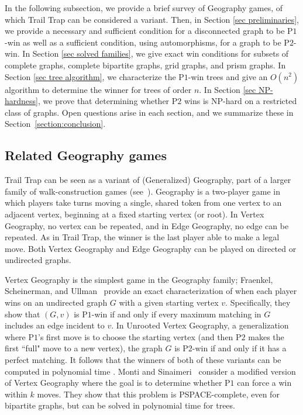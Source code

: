\documentclass{article}
\theoremstyle{plain}
\theoremstyle{definition}
\def\pone{{\rm{P}\ensuremath{1}}}
\def\ptwo{{\rm{P}\ensuremath{2}}}
\def\poneposs{{\rm{P}\ensuremath{1}'s}}
\begin{document}
In the following subsection, we provide a brief survey of Geography games, of which {\sc Trail Trap} can be considered a variant. Then, in Section \ref{sec preliminaries}, we provide a necessary and sufficient condition for a disconnected graph to be \pone{}-win as well as a sufficient condition, using automorphisms, for a graph to be \ptwo{}-win.
In Section \ref{sec solved families}, we give exact win conditions for subsets of complete graphs, complete bipartite graphs, grid graphs, and prism graphs. In Section \ref{sec tree algorithm}, we characterize the \pone{}-win trees and give an $O(n^2)$ algorithm to determine the winner for trees of order $n$. In Section \ref{sec NP-hardness}, we prove that determining whether \ptwo{} wins is NP-hard  on a restricted class of graphs. Open questions arise in each section, and we summarize these in Section~\ref{section:conclusion}.

\subsection{Related Geography games}\label{sub:related games}

{\sc Trail Trap} can be seen as a variant of (Generalized) Geography, part of a larger family of walk-construction games (see~\cite{bodlaender1993complexity}). Geography is a two-player game in which players take turns moving a single, shared token from one vertex to an adjacent vertex, beginning at a fixed starting vertex (or root). In {\sc Vertex Geography}, no vertex can be repeated, and in {\sc Edge Geography}, no edge can be repeated. As in {\sc Trail Trap}, the winner is the last player able to make a legal move. Both {\sc Vertex Geography} and {\sc Edge Geography} can be played on directed or undirected graphs. 

{\sc Vertex Geography} is the simplest game in the Geography family; Fraenkel, Scheinerman, and Ullman~\cite{FSU93} provide an exact characterization of when each player wins on an undirected graph $G$ with a given starting vertex $v$. Specifically, they show that $(G,v)$ is \pone{}-win if and only if every maximum matching in $G$ includes an edge incident to $v$. In {\sc Unrooted Vertex Geography}, a generalization where \poneposs{} first move is to choose the starting vertex (and then \ptwo{} makes the first ``full" move to a new vertex), the graph $G$ is \ptwo{}-win if and only if it has a perfect matching. It follows that the winners of both of these variants can be computed in polynomial time \cite{edmonds65}. Monti and Sinaimeri~\cite{MS18} consider a modified version of {\sc Vertex Geography} where the goal is to determine whether \pone{} can force a win within $k$ moves. They show that this problem is PSPACE-complete, even for bipartite graphs, but can be solved in polynomial time for trees. 
\end{document}

